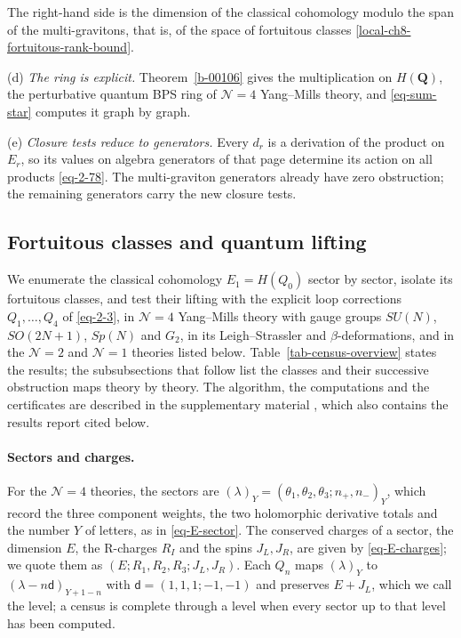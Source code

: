 \documentclass[11pt]{article}
\numberwithin{equation}{section}
\numberwithin{figure}{section}
\numberwithin{table}{section}
\begin{document}
The right-hand side is the dimension of the classical cohomology modulo the span of the multi-gravitons, that is, of the space of fortuitous classes \eqref{local-ch8-fortuitous-rank-bound}.

(d) \emph{The ring is explicit.} Theorem~\ref{b-00106} gives the multiplication on $H(\mathbf Q)$, the perturbative quantum BPS ring of $\mathcal N=4$ Yang--Mills theory, and \eqref{eq-sum-star} computes it graph by graph.

(e) \emph{Closure tests reduce to generators.} Every $d_r$ is a derivation of the product on $E_r$, so its values on algebra generators of that page determine its action on all products \eqref{eq-2-78}. The multi-graviton generators already have zero obstruction; the remaining generators carry the new closure tests.

\subsection{Fortuitous classes and quantum lifting}\label{sec-applications}

We enumerate the classical cohomology $E_1=H(Q_0)$ sector by sector, isolate its fortuitous classes, and test their lifting with the explicit loop corrections $Q_1,\ldots,Q_4$ of \eqref{eq-2-3}, in $\mathcal N=4$ Yang--Mills theory with gauge groups $SU(N)$, $SO(2N+1)$, $Sp(N)$ and $G_2$, in its Leigh--Strassler and $\beta$-deformations, and in the $\mathcal N=2$ and $\mathcal N=1$ theories listed below. Table~\ref{tab-census-overview} states the results; the subsubsections that follow list the classes and their successive obstruction maps theory by theory. The algorithm, the computations and the certificates are described in the supplementary material \cite{Repo}, which also contains the results report cited below.

\paragraph{Sectors and charges.} For the $\mathcal N=4$ theories, the sectors are $(\lambda)_Y=(\theta_1,\theta_2,\theta_3;n_+,n_-)_Y$, which record the three component weights, the two holomorphic derivative totals and the number $Y$ of letters, as in \eqref{eq-E-sector}. The conserved charges of a sector, the dimension $E$, the R-charges $R_I$ and the spins $J_L,J_R$, are given by \eqref{eq-E-charges}; we quote them as $(E;R_1,R_2,R_3;J_L,J_R)$. Each $Q_n$ maps $(\lambda)_Y$ to $(\lambda-n\mathsf d)_{Y+1-n}$ with $\mathsf d=(1,1,1;-1,-1)$ and preserves $E+J_L$, which we call the level; a census is complete through a level when every sector up to that level has been computed.
\end{document}
